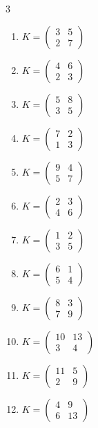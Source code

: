 \bigskip
\begin{multicols}{3}\raggedright
\begin{enumerate}[label=\arabic*.,  leftmargin=*]
\item $K = \begin{pmatrix} 3 & 5 \\ 2 & 7 \end{pmatrix}$
\item $K = \begin{pmatrix} 4 & 6 \\ 2 & 3 \end{pmatrix}$
\item $K = \begin{pmatrix} 5 & 8 \\ 3 & 5 \end{pmatrix}$
\item $K = \begin{pmatrix} 7 & 2 \\ 1 & 3 \end{pmatrix}$
\item $K = \begin{pmatrix} 9 & 4 \\ 5 & 7 \end{pmatrix}$
\item $K = \begin{pmatrix} 2 & 3 \\ 4 & 6 \end{pmatrix}$
\item $K = \begin{pmatrix} 1 & 2 \\ 3 & 5 \end{pmatrix}$
\item $K = \begin{pmatrix} 6 & 1 \\ 5 & 4 \end{pmatrix}$
\item $K = \begin{pmatrix} 8 & 3 \\ 7 & 9 \end{pmatrix}$
\item $K = \begin{pmatrix} 10 & 13 \\ 3 & 4 \end{pmatrix}$
\item $K = \begin{pmatrix} 11 & 5 \\ 2 & 9 \end{pmatrix}$
\item $K = \begin{pmatrix} 4 & 9 \\ 6 & 13 \end{pmatrix}$

\end{enumerate}
\end{multicols}
